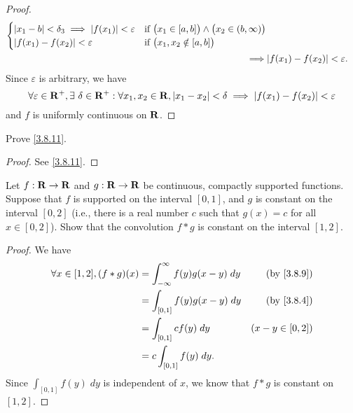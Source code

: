 \begin{proof}
\begin{align*}
\begin{cases}
                 \abs{x_1 - b} < \delta_3 \implies \abs{f(x_1)} < \varepsilon & \text{if } \big(x_1 \in [a, b]\big) \land \big(x_2 \in (b, \infty)\big)  \\
                 \abs{f(x_1) - f(x_2)} < \varepsilon                          & \text{if } \big(x_1, x_2 \notin [a, b]\big)
               \end{cases}            \\
    \implies & \abs{f(x_1) - f(x_2)} < \varepsilon.
  \end{align*}
  Since \(\varepsilon\) is arbitrary, we have
  \[
    \forall \varepsilon \in \mathbf{R}^+, \exists\ \delta \in \mathbf{R}^+ : \forall x_1, x_2 \in \mathbf{R}, \left\lvert x_1 - x_2\right\rvert < \delta \implies \left\lvert f(x_1) - f(x_2)\right\rvert < \varepsilon
  \]
  and \(f\) is uniformly continuous on \(\mathbf{R}\).
\end{proof}

\begin{exercise}\label{ex 3.8.4}
  Prove \cref{3.8.11}.
\end{exercise}

\begin{proof}
  See \cref{3.8.11}.
\end{proof}

\begin{exercise}\label{ex 3.8.5}
  Let \(f : \mathbf{R} \to \mathbf{R}\) and \(g : \mathbf{R} \to \mathbf{R}\) be continuous, compactly supported functions.
  Suppose that \(f\) is supported on the interval \([0, 1]\), and \(g\) is constant on the interval \([0, 2]\)
  (i.e., there is a real number \(c\) such that \(g(x) = c\) for all \(x \in [0, 2]\)).
  Show that the convolution \(f * g\) is constant on the interval \([1, 2]\).
\end{exercise}

\begin{proof}
  We have
  \begin{align*}
    \forall x \in [1, 2], (f * g)(x) & = \int_{-\infty}^\infty f(y) g(x - y) \; dy & \text{(by \cref{3.8.9})} \\
                                     & = \int_{[0, 1]} f(y) g(x - y) \; dy         & \text{(by \cref{3.8.4})} \\
                                     & = \int_{[0, 1]} c f(y) \; dy                & (x - y \in [0, 2])       \\
                                     & = c \int_{[0, 1]} f(y) \; dy.
  \end{align*}
  Since \(\int_{[0, 1]} f(y) \; dy\) is independent of \(x\), we know that \(f * g\) is constant on \([1, 2]\).
\end{proof}

